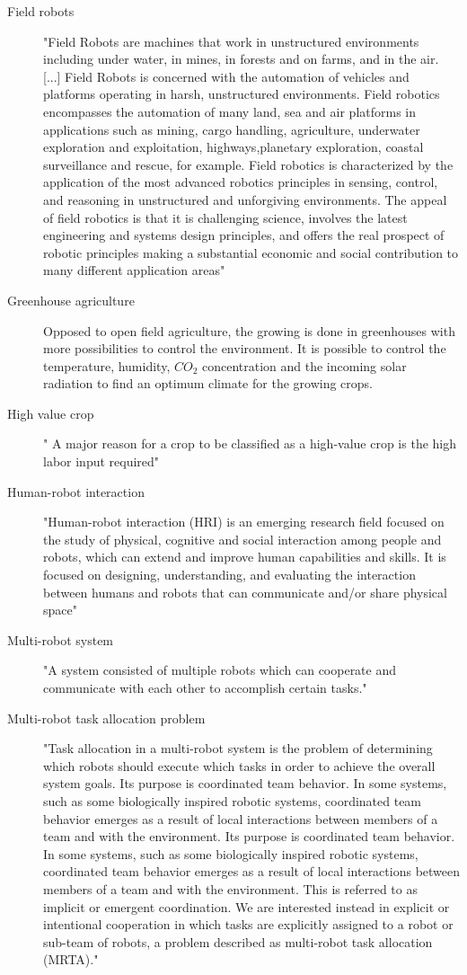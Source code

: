 \documentclass{article}
\begin{document}
\begin{description}
    \item[Field robots] "Field Robots are machines that work in unstructured environments including under water, in mines, in forests and on farms, and in the air. [...] Field Robots is concerned with the automation of vehicles and platforms operating in harsh, unstructured environments. Field robotics encompasses the automation of many land, sea and air platforms in applications such as mining, cargo handling, agriculture, underwater exploration and exploitation, highways,planetary exploration, coastal surveillance and rescue, for example. Field robotics is characterized by the application of the most advanced robotics principles in sensing, control, and reasoning in unstructured and unforgiving environments. The appeal of field robotics is that it is challenging science, involves the latest engineering and systems design principles, and offers the real prospect of robotic principles making a substantial economic and social contribution to many different application areas" \cite{Thorpe2001}
    \item[Greenhouse agriculture] Opposed to open field agriculture, the growing is done in greenhouses with more possibilities to control the environment. It is possible to control the temperature, humidity, $CO_2$ concentration and the incoming solar radiation to find an optimum climate for the growing crops.
    \item[High value crop] " A major reason for a crop to be classified as a high-value crop is the high labor input required" \cite{Bac2014}
    \item[Human-robot interaction] "Human-robot interaction (HRI) is an emerging research field focused on the study of physical, cognitive and social interaction among people and robots, which can extend and improve human capabilities and skills. It is focused on designing, understanding, and evaluating the interaction between humans and robots that can communicate and/or share physical space" \cite{Vasconez2019}
    \item[Multi-robot system] "A system consisted of multiple robots which can cooperate and communicate with each other to accomplish certain tasks." \cite{IGIGlobal2020}
    \item[Multi-robot task allocation problem] "Task allocation in a multi-robot system is the problem of determining which robots should execute which tasks in order to achieve the overall system goals. Its purpose is coordinated team behavior. In some systems, such as some biologically inspired robotic systems, coordinated team behavior emerges as a result of local interactions between members of a team and with the environment. Its purpose is coordinated team behavior. In some systems, such as some biologically inspired robotic systems, coordinated team behavior emerges as a result of local interactions between members of a team and with the environment. This is referred to as implicit or emergent coordination. We are interested instead in explicit or intentional cooperation in which tasks are explicitly assigned to a robot or sub-team of robots, a problem described as multi-robot task allocation (MRTA)." \cite{Korsah2013}

\end{description}
\end{document}
